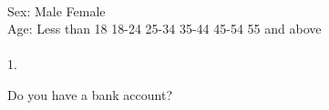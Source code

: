 \documentclass[a5paper]{sdapsclassic}
\begin{document}
\begin{questionnaire}
{		\textcolor{black}{\mytextbox{}{1mm}{5mm}{2mm}{0mm}\hspace{1pt}}%
		\textcolor{black}{\mytextbox{}{1mm}{5mm}{2mm}{0mm}\hspace{1pt}}%
		\textcolor{black}{\mytextbox{}{1mm}{5mm}{2mm}{0mm}\hspace{1pt}}%
		\textcolor{black}{\mytextbox{}{1mm}{5mm}{2mm}{0mm}\hspace{1pt}}%
		\textcolor{black}{\mytextbox{}{1mm}{5mm}{2mm}{0mm}\hspace{1pt}}%
		\textcolor{black}{\mytextbox{}{1mm}{5mm}{2mm}{0mm}\hspace{1pt}}%
		\textcolor{black}{\mytextbox{}{1mm}{5mm}{2mm}{0mm}\hspace{1pt}}%
		\textcolor{black}{\mytextbox{}{1mm}{5mm}{2mm}{0mm}\hspace{1pt}}%
		\textcolor{black}{\mytextbox{}{1mm}{5mm}{2mm}{0mm}\hspace{1pt}}%
		\textcolor{black}{\mytextbox{}{1mm}{5mm}{2mm}{0mm}}%
		\hspace{5pt}%
		\\
		Sex: \hspace{4pt}%
		\textcolor{black}{\mycheckbox{}{}}Male\hspace{5pt}%
		\textcolor{black}{\mycheckbox{}{}}Female%
		\\
		Age:\hspace{6pt}%
		\textcolor{black}{\mycheckbox{}{}}Less than 18\hspace{5pt}%
		\textcolor{black}{\mycheckbox{}{}} 18-24\hspace{5pt}%
		\textcolor{black}{\mycheckbox{}{}} 25-34\hspace{5pt}%
		\textcolor{black}{\mycheckbox{}{}} 35-44\hspace{5pt}%
		\textcolor{black}{\mycheckbox{}{}} 45-54\hspace{5pt}%
		\textcolor{black}{\mycheckbox{}{}} 55 and above%
		\\
		\\
		1.\hspace{4pt}\begin{minipage}{29em}Do you have a bank account? \end{minipage}
}
\end{questionnaire}
\end{document}
